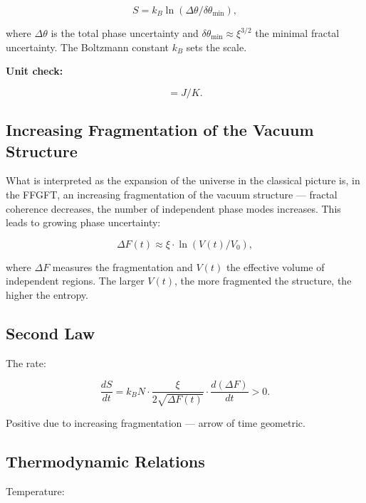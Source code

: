 	\begin{equation}
		S = k_B \ln(\Delta \theta / \delta \theta_{\min}),
	\end{equation}
	
	where \(\Delta \theta\) is the total phase uncertainty and \(\delta \theta_{\min} \approx \xi^{3/2}\) the minimal fractal uncertainty. The Boltzmann constant \(k_B\) sets the scale.
	
	\textbf{Unit check:}
	
	\begin{equation}
		[S] = \si{J/K}.
	\end{equation}
	
	\subsection*{Increasing Fragmentation of the Vacuum Structure}
	
	What is interpreted as the expansion of the universe in the classical picture is, in the FFGFT, an increasing fragmentation of the vacuum structure — fractal coherence decreases, the number of independent phase modes increases. This leads to growing phase uncertainty:
	
	\begin{equation}
		\Delta F(t) \approx \xi \cdot \ln(V(t)/V_0),
	\end{equation}
	
	where \(\Delta F\) measures the fragmentation and \(V(t)\) the effective volume of independent regions. The larger \(V(t)\), the more fragmented the structure, the higher the entropy.
	
	\subsection*{Second Law}
	
	The rate:
	
	\begin{equation}
		\frac{dS}{dt} = k_B N \cdot \frac{\xi}{2 \sqrt{\Delta F(t)}} \cdot \frac{d(\Delta F)}{dt} > 0.
	\end{equation}
	
	Positive due to increasing fragmentation — arrow of time geometric.
	
	\subsection*{Thermodynamic Relations}
	
	Temperature:
	
